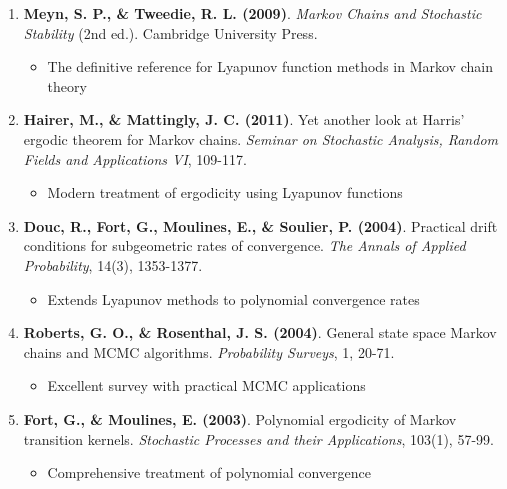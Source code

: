 \documentclass{amsart}
\theoremstyle{plain}
\theoremstyle{definition}
\theoremstyle{remark}
\begin{document}
\begin{enumerate}
	\item \textbf{Meyn, S. P., \& Tweedie, R. L. (2009)}. \textit{Markov Chains and Stochastic Stability} (2nd ed.). Cambridge University Press.
	\begin{itemize}
		\item The definitive reference for Lyapunov function methods in Markov chain theory
	\end{itemize}
	\item \textbf{Hairer, M., \& Mattingly, J. C. (2011)}. Yet another look at Harris' ergodic theorem for Markov chains. \textit{Seminar on Stochastic Analysis, Random Fields and Applications VI}, 109-117.
	\begin{itemize}
		\item Modern treatment of ergodicity using Lyapunov functions
	\end{itemize}
	\item \textbf{Douc, R., Fort, G., Moulines, E., \& Soulier, P. (2004)}. Practical drift conditions for subgeometric rates of convergence. \textit{The Annals of Applied Probability}, 14(3), 1353-1377.
	\begin{itemize}
		\item Extends Lyapunov methods to polynomial convergence rates
	\end{itemize}
	\item \textbf{Roberts, G. O., \& Rosenthal, J. S. (2004)}. General state space Markov chains and MCMC algorithms. \textit{Probability Surveys}, 1, 20-71.
	\begin{itemize}
		\item Excellent survey with practical MCMC applications
	\end{itemize}
	\item \textbf{Fort, G., \& Moulines, E. (2003)}. Polynomial ergodicity of Markov transition kernels. \textit{Stochastic Processes and their Applications}, 103(1), 57-99.
	\begin{itemize}
		\item Comprehensive treatment of polynomial convergence
	\end{itemize}
\end{enumerate}
\end{document}
